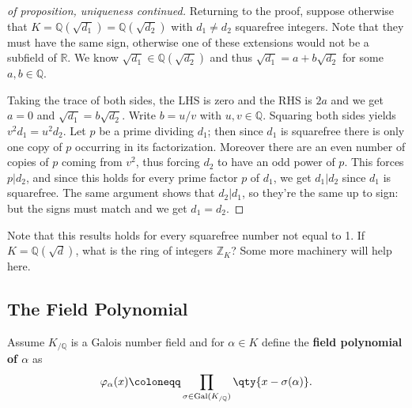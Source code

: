 \begin{proof}[of proposition, uniqueness continued]

Returning to the proof, suppose otherwise that
\(K = {\mathbb{Q}}(\sqrt{d_1} ) = {\mathbb{Q}}( \sqrt{d_2} )\) with
\(d_1\neq d_2\) squarefree integers. Note that they must have the same
sign, otherwise one of these extensions would not be a subfield of
\({\mathbb{R}}\). We know \(\sqrt{d_1} \in {\mathbb{Q}}( \sqrt{d_2} )\)
and thus \(\sqrt{d_1} = a + b \sqrt{d_2}\) for some
\(a, b\in {\mathbb{Q}}\).

\hfill\break

Taking the trace of both sides, the LHS is zero and the RHS is \(2a\)
and we get \(a=0\) and \(\sqrt{d_1} = b \sqrt{d_2}\). Write \(b = u/v\)
with \(u,v\in {\mathbb{Q}}\). Squaring both sides yields
\(v^2 d_1 = u^2 d_2\). Let \(p\) be a prime dividing \(d_1\); then since
\(d_1\) is squarefree there is only one copy of \(p\) occurring in its
factorization. Moreover there are an even number of copies of \(p\)
coming from \(v^2\), thus forcing \(d_2\) to have an odd power of \(p\).
This forces \(p\mathrel{\Big|}d_2\), and since this holds for every
prime factor \(p\) of \(d_1\), we get \(d_1 \mathrel{\Big|}d_2\) since
\(d_1\) is squarefree. The same argument shows that
\(d_2 \mathrel{\Big|}d_1\), so they're the same up to sign: but the
signs must match and we get \(d_1 = d_2\).

\end{proof}

\begin{remark}

Note that this results holds for every squarefree number not equal to 1.
If \(K = {\mathbb{Q}}( \sqrt{d} )\), what is the ring of integers
\({\mathbb{Z}}_K\)? Some more machinery will help here.

\end{remark}

\hypertarget{the-field-polynomial}{%
\subsection{The Field Polynomial}\label{the-field-polynomial}}

\begin{definition}

Assume \(K_{/{\mathbb{Q}}}\) is a Galois number field and for
\(\alpha\in K\) define the \textbf{field polynomial of \(\alpha\)} as
\begin{align*}
\varphi_{\alpha}(x) \coloneqq\prod_{ \sigma\in \operatorname{Gal}(K_{/{\mathbb{Q}}})} \qty{ x - \sigma(\alpha)}
.\end{align*}

\end{definition}

